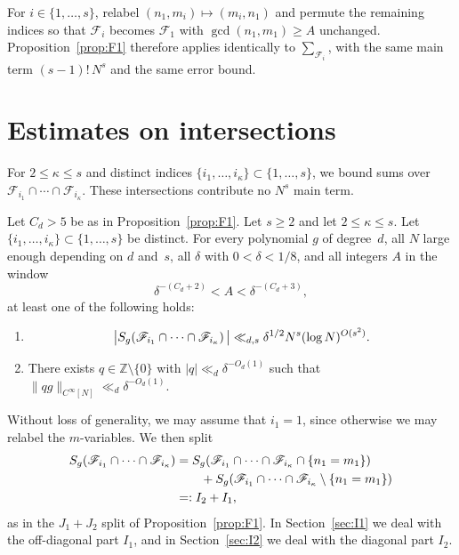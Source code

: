 \begin{remark}\label{rem:Fi-symmetry}
For $i\in\{1,\ldots,s\}$, relabel $(n_1,m_i)\mapsto(m_i,n_1)$ and permute the remaining indices so that $\mathscr{F}_i$ becomes $\mathscr{F}_1$ with $\gcd(n_1,m_1)\geq A$ unchanged.  Proposition~\ref{prop:F1} therefore applies identically to $\sum_{\mathscr{F}_i}$, with the same main term $(s-1)!\,N^s$ and the same error bound.
\end{remark}

\section{Estimates on intersections}
\label{sec:intersection}

For $2\leq\kappa\leq s$ and distinct indices $\{i_1,\ldots,i_\kappa\}\subset\{1,\ldots,s\}$, we bound sums over $\mathscr{F}_{i_1}\cap\cdots\cap\mathscr{F}_{i_\kappa}$.  These intersections contribute no $N^s$ main term.

\begin{proposition}\label{prop:intersection}
Let $C_d>5$ be as in Proposition~\ref{prop:F1}.
Let $s\geq 2$ and let $2\leq\kappa\leq s$.
Let $\{i_1,\ldots,i_\kappa\}\subset\{1,\ldots,s\}$ be distinct.
For every polynomial $g$ of degree~$d$, all $N$ large enough depending on $d$ and~$s$, all $\delta$ with $0<\delta<1/8$,
and all integers $A$ in the window
\[
\delta^{-(C_d+2)}<A<\delta^{-(C_d+3)},
\]
at least one of the following holds:
\begin{enumerate}
    \item \[
    \big|S_g\!\left(\mathscr{F}_{i_1}\cap\cdots\cap\mathscr{F}_{i_\kappa}\right)\big|
    \ll_{d,s} \delta^{1/2} N^s(\log N)^{O(s^2)}.
    \]
    \item There exists $q\in\mathbb{Z}\setminus\{0\}$ with $|q|\ll_d\delta^{-O_d(1)}$ such that $\|qg\|_{C^\infty[N]}\ll_d\delta^{-O_d(1)}$.
\end{enumerate}
\end{proposition}

Without loss of generality, we may assume that $i_1=1$, since otherwise we may relabel the $m$-variables.
We then split
\begin{align*}
S_g\!\left(\mathscr{F}_{i_1}\cap\cdots\cap\mathscr{F}_{i_\kappa}\right)
&=S_g\!\left(\mathscr{F}_{i_1}\cap\cdots\cap\mathscr{F}_{i_\kappa}\cap\{n_1=m_1\}\right)\\
&\qquad+S_g\!\left(\mathscr{F}_{i_1}\cap\cdots\cap\mathscr{F}_{i_\kappa}\setminus\{n_1=m_1\}\right)\\
&=:I_2+I_1,
\end{align*}
as in the $J_1+J_2$ split of Proposition~\ref{prop:F1}.
In Section~\ref{sec:I1} we deal with the off-diagonal part $I_1$, and in Section~\ref{sec:I2} we deal with the diagonal part $I_2$.

